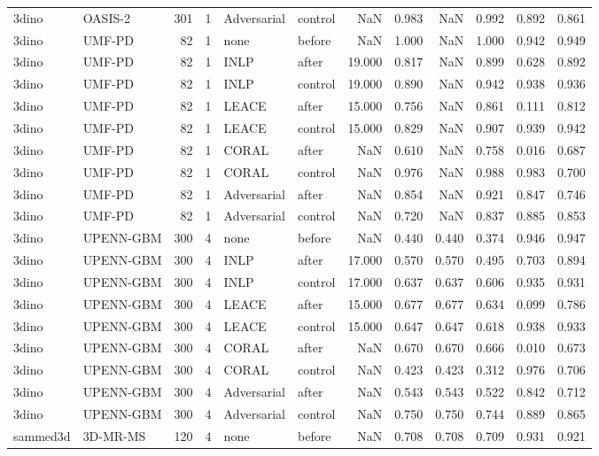 \begin{tabular}{llrrllrrrrrr}
3dino & OASIS-2 & 301 & 1 & Adversarial & control & NaN & 0.983 & NaN & 0.992 & 0.892 & 0.861 \\
3dino & UMF-PD & 82 & 1 & none & before & NaN & 1.000 & NaN & 1.000 & 0.942 & 0.949 \\
3dino & UMF-PD & 82 & 1 & INLP & after & 19.000 & 0.817 & NaN & 0.899 & 0.628 & 0.892 \\
3dino & UMF-PD & 82 & 1 & INLP & control & 19.000 & 0.890 & NaN & 0.942 & 0.938 & 0.936 \\
3dino & UMF-PD & 82 & 1 & LEACE & after & 15.000 & 0.756 & NaN & 0.861 & 0.111 & 0.812 \\
3dino & UMF-PD & 82 & 1 & LEACE & control & 15.000 & 0.829 & NaN & 0.907 & 0.939 & 0.942 \\
3dino & UMF-PD & 82 & 1 & CORAL & after & NaN & 0.610 & NaN & 0.758 & 0.016 & 0.687 \\
3dino & UMF-PD & 82 & 1 & CORAL & control & NaN & 0.976 & NaN & 0.988 & 0.983 & 0.700 \\
3dino & UMF-PD & 82 & 1 & Adversarial & after & NaN & 0.854 & NaN & 0.921 & 0.847 & 0.746 \\
3dino & UMF-PD & 82 & 1 & Adversarial & control & NaN & 0.720 & NaN & 0.837 & 0.885 & 0.853 \\
3dino & UPENN-GBM & 300 & 4 & none & before & NaN & 0.440 & 0.440 & 0.374 & 0.946 & 0.947 \\
3dino & UPENN-GBM & 300 & 4 & INLP & after & 17.000 & 0.570 & 0.570 & 0.495 & 0.703 & 0.894 \\
3dino & UPENN-GBM & 300 & 4 & INLP & control & 17.000 & 0.637 & 0.637 & 0.606 & 0.935 & 0.931 \\
3dino & UPENN-GBM & 300 & 4 & LEACE & after & 15.000 & 0.677 & 0.677 & 0.634 & 0.099 & 0.786 \\
3dino & UPENN-GBM & 300 & 4 & LEACE & control & 15.000 & 0.647 & 0.647 & 0.618 & 0.938 & 0.933 \\
3dino & UPENN-GBM & 300 & 4 & CORAL & after & NaN & 0.670 & 0.670 & 0.666 & 0.010 & 0.673 \\
3dino & UPENN-GBM & 300 & 4 & CORAL & control & NaN & 0.423 & 0.423 & 0.312 & 0.976 & 0.706 \\
3dino & UPENN-GBM & 300 & 4 & Adversarial & after & NaN & 0.543 & 0.543 & 0.522 & 0.842 & 0.712 \\
3dino & UPENN-GBM & 300 & 4 & Adversarial & control & NaN & 0.750 & 0.750 & 0.744 & 0.889 & 0.865 \\
sammed3d & 3D-MR-MS & 120 & 4 & none & before & NaN & 0.708 & 0.708 & 0.709 & 0.931 & 0.921 \\

\end{tabular}
